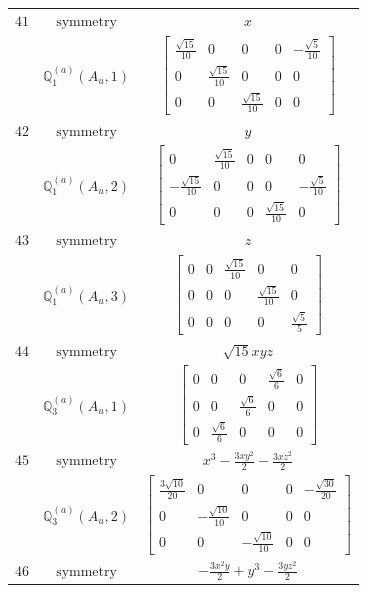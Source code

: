 \documentclass[fleqn,8pt,landscape]{jsarticle}
\begin{document}
\begin{longtable}{ccc}
$ 41 $ & $ \text{symmetry} $ & $ x $ \\
$  $ & $ \mathbb{Q}_{1}^{(a)}(A_{u},1) $ & $ \begin{bmatrix} \frac{\sqrt{15}}{10} & 0 & 0 & 0 & - \frac{\sqrt{5}}{10} \\ 0 & \frac{\sqrt{15}}{10} & 0 & 0 & 0 \\ 0 & 0 & \frac{\sqrt{15}}{10} & 0 & 0 \end{bmatrix} $ \\ \hline
$ 42 $ & $ \text{symmetry} $ & $ y $ \\
$  $ & $ \mathbb{Q}_{1}^{(a)}(A_{u},2) $ & $ \begin{bmatrix} 0 & \frac{\sqrt{15}}{10} & 0 & 0 & 0 \\ - \frac{\sqrt{15}}{10} & 0 & 0 & 0 & - \frac{\sqrt{5}}{10} \\ 0 & 0 & 0 & \frac{\sqrt{15}}{10} & 0 \end{bmatrix} $ \\ \hline
$ 43 $ & $ \text{symmetry} $ & $ z $ \\
$  $ & $ \mathbb{Q}_{1}^{(a)}(A_{u},3) $ & $ \begin{bmatrix} 0 & 0 & \frac{\sqrt{15}}{10} & 0 & 0 \\ 0 & 0 & 0 & \frac{\sqrt{15}}{10} & 0 \\ 0 & 0 & 0 & 0 & \frac{\sqrt{5}}{5} \end{bmatrix} $ \\ \hline
$ 44 $ & $ \text{symmetry} $ & $ \sqrt{15} x y z $ \\
$  $ & $ \mathbb{Q}_{3}^{(a)}(A_{u},1) $ & $ \begin{bmatrix} 0 & 0 & 0 & \frac{\sqrt{6}}{6} & 0 \\ 0 & 0 & \frac{\sqrt{6}}{6} & 0 & 0 \\ 0 & \frac{\sqrt{6}}{6} & 0 & 0 & 0 \end{bmatrix} $ \\ \hline
$ 45 $ & $ \text{symmetry} $ & $ x^{3} - \frac{3 x y^{2}}{2} - \frac{3 x z^{2}}{2} $ \\
$  $ & $ \mathbb{Q}_{3}^{(a)}(A_{u},2) $ & $ \begin{bmatrix} \frac{3 \sqrt{10}}{20} & 0 & 0 & 0 & - \frac{\sqrt{30}}{20} \\ 0 & - \frac{\sqrt{10}}{10} & 0 & 0 & 0 \\ 0 & 0 & - \frac{\sqrt{10}}{10} & 0 & 0 \end{bmatrix} $ \\ \hline
$ 46 $ & $ \text{symmetry} $ & $ - \frac{3 x^{2} y}{2} + y^{3} - \frac{3 y z^{2}}{2} $ \\

\end{longtable}
\end{document}

